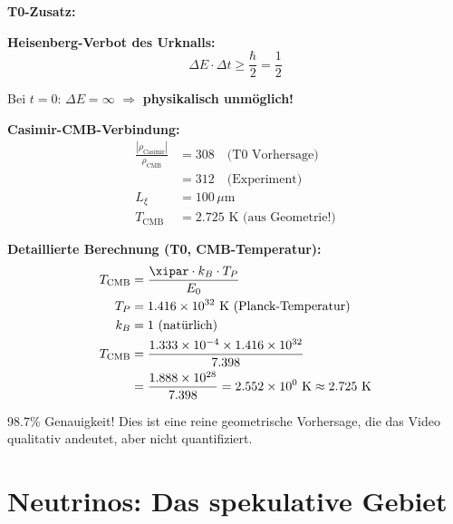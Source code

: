 	\begin{vorteil}
		\textbf{T0-Zusatz:}
		
		\textbf{Heisenberg-Verbot des Urknalls:}
		\begin{equation}
			\Delta E \cdot \Delta t \geq \frac{\hbar}{2} = \frac{1}{2}
		\end{equation}
		
		Bei $t = 0$: $\Delta E = \infty$ $\Rightarrow$ \textbf{physikalisch unmöglich!}
		
		\textbf{Casimir-CMB-Verbindung:}
		\begin{align}
			\frac{|\rho_{\text{Casimir}}|}{\rho_{\text{CMB}}} &= 308 \quad \text{(T0 Vorhersage)} \\
			&= 312 \quad \text{(Experiment)} \\
			L_\xi &= 100 \, \mu\text{m} \\
			T_{\text{CMB}} &= 2.725 \text{ K (aus Geometrie!)}
		\end{align}
		
		\textbf{Detaillierte Berechnung (T0, CMB-Temperatur):}
		\begin{align}
			T_{\text{CMB}} &= \frac{\xipar \cdot k_B \cdot T_P}{E_0} \\
			T_P &= 1.416 \times 10^{32} \text{ K (Planck-Temperatur)} \\
			k_B &= 1 \text{ (natürlich)} \\
			T_{\text{CMB}} &= \frac{1.333 \times 10^{-4} \times 1.416 \times 10^{32}}{7.398} \\
			&= \frac{1.888 \times 10^{28}}{7.398} = 2.552 \times 10^0 \text{ K} \approx 2.725 \text{ K}
		\end{align}
		
		98.7\% Genauigkeit! Dies ist eine reine geometrische Vorhersage, die das Video qualitativ andeutet, aber nicht quantifiziert.
	\end{vorteil}
	
	\section{Neutrinos: Das spekulative Gebiet}
	
